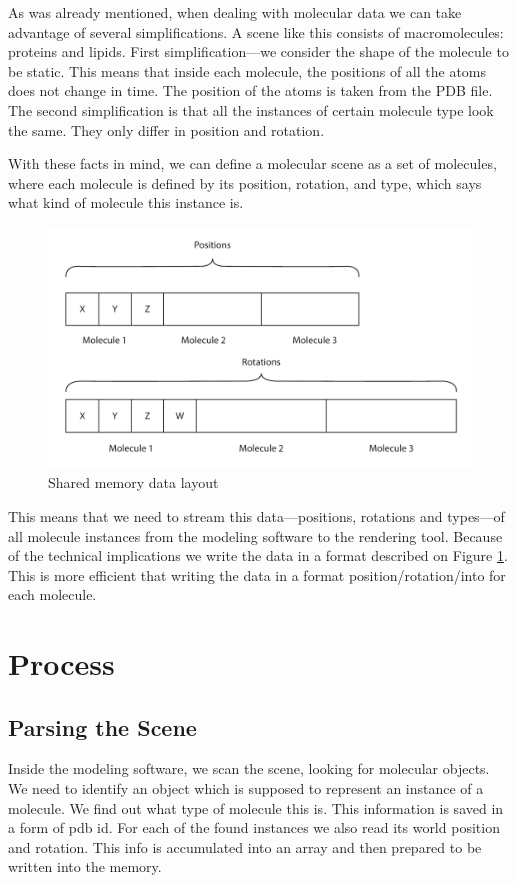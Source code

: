 \documentclass[
  digital, %
  table,   %
  nolof,     %
  nolot,     %
]{fithesis3}
\begin{document}
As was already mentioned, when dealing with molecular data we can take advantage of several simplifications. A scene like this consists of macromolecules: proteins and lipids. First simplification—we consider the shape of the molecule to be static. This means that inside each molecule, the positions of all the atoms does not change in time. The position of the atoms is taken from the PDB file. The second simplification is that all the instances of certain molecule type look the same. They only differ in position and rotation.

With these facts in mind, we can define a molecular scene as a set of molecules, where each molecule is defined by its position, rotation, and type, which says what kind of molecule this instance is.

\begin{figure}
  \centering
  \includegraphics[scale=0.7]{images/data-layout.pdf}
  \caption{Shared memory data layout}
  \label{fig:data-layout}
\end{figure}

This means that we need to stream this data—positions, rotations and types—of all molecule instances from the modeling software to the rendering tool. Because of the technical implications we write the data in a format described on Figure \ref{fig:data-layout}. This is more efficient that writing the data in a format position/rotation/into for each molecule.
\section{Process}
\subsection{Parsing the Scene}
Inside the modeling software, we scan the scene, looking for molecular objects. We need to identify an object which is supposed to represent an instance of a molecule. We find out what type of molecule this is. This information is saved in a form of pdb id. For each of the found instances we also read its world position and rotation. This info is accumulated into an array and then prepared to be written into the memory.
\end{document}
